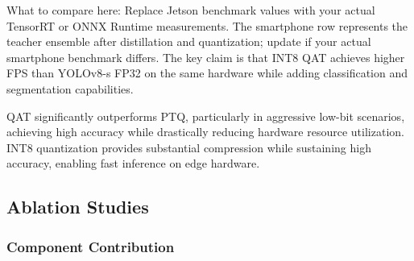 \documentclass[10pt,a4paper,twocolumn]{article}
\begin{document}
\begin{table}[htbp]
\centering
\caption{Edge deployment benchmarks}
\label{tab:edge}
\end{table}

What to compare here: Replace Jetson benchmark values with your actual TensorRT or ONNX Runtime measurements. The smartphone row represents the teacher ensemble after distillation and quantization; update if your actual smartphone benchmark differs. The key claim is that INT8 QAT achieves higher FPS than YOLOv8-s FP32 on the same hardware while adding classification and segmentation capabilities.

QAT significantly outperforms PTQ, particularly in aggressive low-bit scenarios, achieving high accuracy while drastically reducing hardware resource utilization. INT8 quantization provides substantial compression while sustaining high accuracy, enabling fast inference on edge hardware.

\subsection{Ablation Studies}

\subsubsection{Component Contribution}
\end{document}
